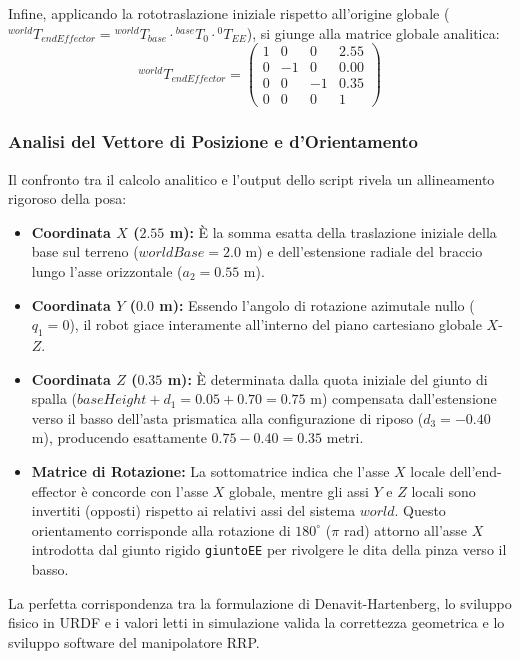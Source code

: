 \documentclass[11pt, a4paper]{report}
\begin{document}
Infine, applicando la rototraslazione iniziale rispetto all'origine globale (\(^{world}T_{endEffector} = {^{world}T_{base}} \cdot {^{base}T_0} \cdot {^{0}T_{EE}}\)), si giunge alla matrice globale analitica:
\[
    ^{world}T_{endEffector} =
    \begin{pmatrix}
        1 & 0 & 0 & 2.55 \\
        0 & -1 & 0 & 0.00 \\
        0 & 0 & -1 & 0.35 \\
        0 & 0 & 0 & 1
    \end{pmatrix}
\]

\subsubsection{Analisi del Vettore di Posizione e d'Orientamento}

Il confronto tra il calcolo analitico e l'output dello script rivela un allineamento rigoroso della posa:
\begin{itemize}
    \item \textbf{Coordinata $X$ ($2.55$ m):} È la somma esatta della traslazione iniziale della base sul terreno (\(worldBase = 2.0\) m) e dell'estensione radiale del braccio lungo l'asse orizzontale (\(a_2 = 0.55\) m).

    \item \textbf{Coordinata $Y$ ($0.0$ m):} Essendo l'angolo di rotazione azimutale nullo (\(q_1 = 0\)), il robot giace interamente all'interno del piano cartesiano globale $X$-$Z$.

    \item \textbf{Coordinata $Z$ ($0.35$ m):} È determinata dalla quota iniziale del giunto di spalla (\(baseHeight + d_1 = 0.05 + 0.70 = 0.75\) m) compensata dall'estensione verso il basso dell'asta prismatica alla configurazione di riposo (\(d_3 = -0.40\) m), producendo esattamente \(0.75 - 0.40 = 0.35\) metri.

    \item \textbf{Matrice di Rotazione:} La sottomatrice indica che l'asse $X$ locale dell'end-effector è concorde con l'asse $X$ globale, mentre gli assi $Y$ e $Z$ locali sono invertiti (opposti) rispetto ai relativi assi del sistema $world$. Questo orientamento corrisponde alla rotazione di $180^\circ$ (\(\pi\) rad) attorno all'asse $X$ introdotta dal giunto rigido \texttt{giuntoEE} per rivolgere le dita della pinza verso il basso.
\end{itemize}

La perfetta corrispondenza tra la formulazione di Denavit-Hartenberg, lo sviluppo fisico in URDF e i valori letti in simulazione valida la correttezza geometrica e lo sviluppo software del manipolatore RRP.
\end{document}
